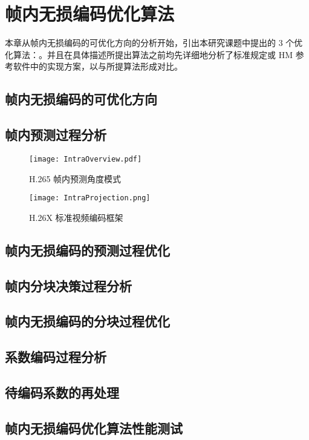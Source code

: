 \chapter{帧内无损编码优化算法}
\label{cha:c3}
本章从帧内无损编码的可优化方向的分析开始，引出本研究课题中提出的 3 个优化算法：。并且在具体描述所提出算法之前均先详细地分析了标准规定或 HM 参考软件中的实现方案，以与所提算法形成对比。

\section{帧内无损编码的可优化方向}

\section{帧内预测过程分析}
\label{cha:IntraPredDetail}

\begin{figure}[hbt]
    \centering
    \texttt{[image: IntraOverview.pdf]}
    \caption{H.265 帧内预测角度模式}
    \label{fig:IntraOverview}
\end{figure}

\begin{figure}[hbt]
    \centering
    \texttt{[image: IntraProjection.png]}
    \caption{H.26X 标准视频编码框架}
    \label{fig:IntraProjection}
\end{figure}

\section{帧内无损编码的预测过程优化}

\section{帧内分块决策过程分析}

\section{帧内无损编码的分块过程优化}

\section{系数编码过程分析}

\section{待编码系数的再处理}

\section{帧内无损编码优化算法性能测试}